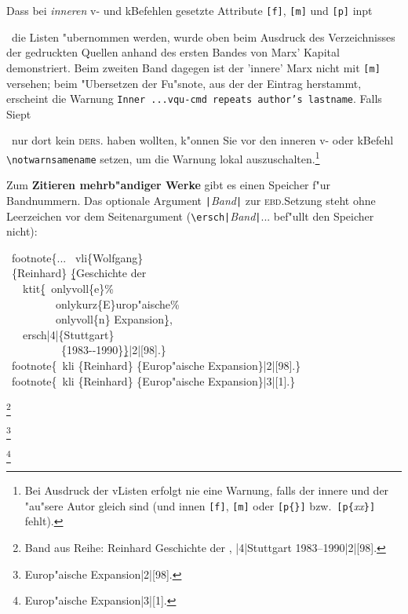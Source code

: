 \documentclass[12pt,a4paper]{article}
\newcommand{\pdfko}[1]{\kern #1pt
                          \strut\ignorespaces}%
\newcommand{\pbs}{\string\ \unskip}
\newcommand{\bs}{\protect\pbs}
\begin{document}
\vspace{1.25ex}\noindent
Dass bei \textit{inneren} v- und k\fhy Befehlen gesetzte Attribute \verb|[f]|, 
\verb|[m]| und \verb|[p]| in\pdfko{1}\ 
die Listen "ubernommen werden, wurde oben 
beim Ausdruck des Verzeichnisses der gedruckten Quellen anhand des ersten 
Bandes von Marx' Kapital demonstriert. Beim zweiten Band dagegen ist 
der 'innere' Marx nicht mit \verb|[m]| versehen; beim "Ubersetzen der 
Fu"snote, aus der der Eintrag herstammt, erscheint die Warnung 
{\footnotesize\texttt{Inner ...vqu-cmd repeats author's lastname}}. 
Falls Sie\pdfko{1}\ nur dort kein \textsc{ders.} haben wollten, k"onnen
Sie vor den inneren v- oder k\fhy Befehl \verb|\notwarnsamename| 
setzen, um die Warnung lokal auszuschalten.\footnote{Bei Ausdruck der 
v\fhy Listen erfolgt nie eine Warnung, falls der 
innere und der "au"sere Autor gleich sind (und innen \texttt{[f]}, 
\texttt{[m]} oder \texttt{[p\{\}]} bzw.\ \texttt{[p\{}\textit{xx}\texttt{\}]} fehlt).}

\newpage\noindent
Zum \textbf{Zitieren mehrb"andiger Werke} gibt es einen Speicher 
f"ur Bandnummern. Das optionale Argument \verb+|+\textit{Band}\verb+|+
zur \textsc{ebd}.\hy Setzung steht ohne Leerzeichen vor dem 
Seitenargument (\verb+\ersch|+\textit{Band}\verb+|+... bef"ullt den Speicher nicht):

\label{Reinhard}%
\Doppelbox
{\bs footnote\{... \bs vli\{Wolfgang\} 
 \\ \ \{Reinhard\} \b{\b{\{}}Geschichte der
 \\ \ \ \bs ktit\b{\{}\bs onlyvoll\{e\}\%
 \\ \ \ \ \ \ \ \ \ \bs onlykurz\{E\}urop"aische\%
 \\ \ \ \ \ \ \ \ \ \bs onlyvoll\{n\} Expansion\b{\}}, 
 \\ \ \ \bs ersch\string|4\string|\{Stuttgart\}
 \\ \ \ \ \ \ \ \ \ \ \ \{1983-{}-1990\}\b{\b{\}}}\string|2\string|[98].\}
 \\[1ex] \bs footnote\{\bs kli \{Reinhard\} \{Europ"aische Expansion\}\string|2\string|[98].\}
 \\[1ex] \bs footnote\{\bs kli \{Reinhard\} \{Europ"aische Expansion\}\string|3\string|[1].\}
}
{\vspace{1.5ex}%
 \footnote{Band aus Reihe: \notktitaddtok{} {Reinhard} {Geschichte der
 ,
 \ersch|4|{Stuttgart} {1983--1990}}|2|[98].\label{Ranf}}
 
 \footnote{ {Europ"aische Expansion}|2|[98].}
 
 \footnote{ {Europ"aische Expansion}|3|[1].\label{Rend}}
}
\end{document}
